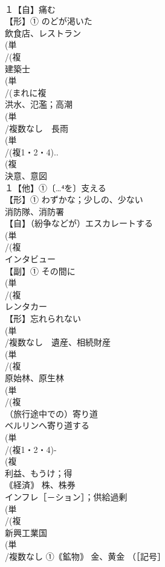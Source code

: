 \documentclass[8pt]{extreport}
\begin{document}
\begin{CJK}{UTF8}{min}
\\	１【自】痛む 
\\	【形】① のどが渇いた 
\\	飲食店、レストラン
\\	(単
\\	/(複
\\	建築士
\\	(単
\\	/(まれに複
\\	洪水、氾濫；高潮
\\	(単
\\	/複数なし　長雨
\\	(単
\\	/(複1・2・4)..
\\	(複
\\	決意、意図 
\\	１【他】①〔…⁴を〕支える 
\\	【形】① わずかな；少しの、少ない
\\	消防隊、消防署
\\	【自】（紛争などが）エスカレートする
\\	(単
\\	/(複
\\	インタビュー 
\\	【副】① その間に
\\	(単
\\	/(複
\\	レンタカー
\\	【形】忘れられない
\\	(単
\\	/複数なし　遺産、相続財産
\\	(単
\\	/(複
\\	原始林、原生林 
\\	(単
\\	/(複
\\	（旅行途中での）寄り道 
\\	ベルリンへ寄り道する
\\	(単
\\	/(複1・2・4)-
\\	(複
\\	利益、もうけ；得 
\\	｟経済｠ 株、株券
\\	インフレ［－ション］；供給過剰
\\	(単
\\	/(複
\\	新興工業国
\\	(単
\\	/複数なし ①｟鉱物｠ 金、黄金 （［記号］

\end{CJK}
\end{document}
